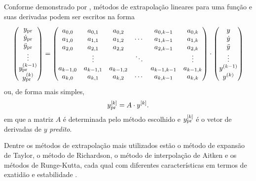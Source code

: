 Conforme demonstrado por , métodos de extrapolação lineares para uma função e suas derivadas podem ser escritos na forma
\[
\begin{pmatrix}
	\predicted{y} \\
	\predicted{\deriv{1}{y}} \\
	\predicted{\deriv{2}{y}} \\
	\vdots \\
	\predicted{\deriv{\taylorOrder-1}{y}} \\
	\predicted{\deriv{\taylorOrder}{y}}
\end{pmatrix}
=
\begin{pmatrix}
	a_{0,0} & a_{0,1} & a_{0,2} &  & a_{0,\taylorOrder-1} & a_{0,\taylorOrder} \\
	a_{1,0} & a_{1,1} & a_{1,2} & \cdots & a_{1,\taylorOrder-1} & a_{1,\taylorOrder} \\
	a_{2,0} & a_{2,1} & a_{2,2} &  & a_{2,\taylorOrder-1} & a_{2,\taylorOrder} \\
     & \vdots & & \ddots & & \vdots \\
    a_{\taylorOrder-1,0} & a_{\taylorOrder-1,1} & a_{\taylorOrder-1,2} &  & a_{\taylorOrder-1,\taylorOrder-1} & a_{\taylorOrder-1,\taylorOrder} \\
    a_{\taylorOrder,0} & a_{\taylorOrder,1} & a_{\taylorOrder,2} & \cdots & a_{\taylorOrder,\taylorOrder-1} & a_{\taylorOrder,\taylorOrder}
\end{pmatrix}
\cdot
\begin{pmatrix}
	y \\
	\deriv{1}{y} \\
	\deriv{2}{y} \\
	\vdots \\
	\deriv{\taylorOrder-1}{y} \\
	\deriv{\taylorOrder}{y}
\end{pmatrix}
\]
ou, de forma mais simples,
\begin{equation}
	\drvec{\taylorOrder}{\predicted{y}} = A \cdot \drvec{\taylorOrder}{y}.
\end{equation}
em que a matriz \(A\) é determinada pelo método escolhido e \(\drvec{\taylorOrder}{\predicted{y}}\) é o vetor de derivadas de \(y\) \textit{predito}.

Dentre os métodos de extrapolação mais utilizados estão o método de expansão de Taylor, o método de Richardson, o método de interpolação de Aitken e os métodos de Runge-Kutta, cada qual com diferentes características em termos de exatidão e estabilidade \cite{bib:gear_book}.

